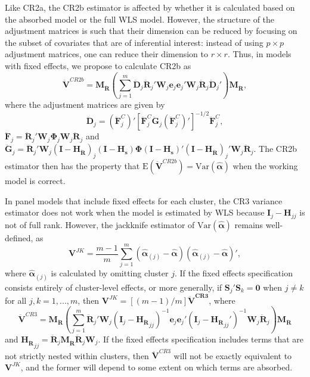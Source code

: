 \documentclass[12pt]{article}\usepackage[]{graphicx}\usepackage[]{color}
\newcommand{\E}{\text{E}}
\newcommand{\Var}{\text{Var}}
\newcommand{\bm}{\mathbf}
\newcommand{\bs}{\boldsymbol}
\begin{document}
Like CR2a, the CR2b estimator is affected by whether it is calculated based on the absorbed model or the full WLS model. However, the structure of the adjustment matrices is such that their dimension can be reduced by focusing on the subset of covariates that are of inferential interest: instead of using $p \times p$ adjustment matrices, one can reduce their dimension to $r \times r$. Thus, in models with fixed effects, we propose to calculate CR2b as 
\begin{equation}
\label{eq:V_CR2b_FE}
\bm{\ddot{V}}^{CR2b} = \bm{M_{\ddot{R}}} \left(\sum_{j=1}^m \bm{\ddot{D}}_j \bm{\ddot{R}}_j' \bm{W}_j \bm{e}_j \bm{e}_j' \bm{W}_j \bm{\ddot{R}}_j \bm{\ddot{D}}_j'\right) \bm{M_{\ddot{R}}},
\end{equation}
where the adjustment matrices are given by 
\begin{equation}
\bm{\ddot{D}}_j = \left(\bm{\ddot{F}}_j^C\right)'\left[\bm{\ddot{F}}_j^C \bm{\ddot{G}}_j \left(\bm{\ddot{F}}_j^C\right)'\right]^{-1/2}\bm{\ddot{F}}_j^C,
\end{equation}
$\bm{\ddot{F}}_j = \bm{\ddot{R}}_j' \bm{W}_j \bs\Phi_j \bm{W}_j \bm{\ddot{R}}_j$ and $\bm{\ddot{G}}_j = \bm{\ddot{R}}_j' \bm{W}_j \left(\bm{I} - \bm{H_{\ddot{R}}}\right)_j  \left(\bm{I} - \bm{H_s}\right) \bs\Phi \left(\bm{I} - \bm{H_s}\right)' \left(\bm{I} - \bm{H_{\ddot{R}}}\right)_j' \bm{W}_j \bm{\ddot{R}}_j$. The CR2b estimator then has the property that $\E\left(\bm{\ddot{V}}^{CR2b}\right) = \Var\left(\bs{\hat\alpha}\right)$ when the working model is correct.

In panel models that include fixed effects for each cluster, the CR3 variance estimator does not work when the model is estimated by WLS because $\bm{I}_j - \bm{H}_{jj}$ is not of full rank. 
However, the jackknife estimator of $\Var\left(\bs{\hat\alpha}\right)$ remains well-defined, as 
\begin{equation}
\bm{V}^{JK} = \frac{m - 1}{m} \sum_{j=1}^m \left(\bs{\hat\alpha}_{(j)} - \bs{\hat\alpha}\right) \left(\bs{\hat\alpha}_{(j)} - \bs{\hat\alpha}\right)',
\end{equation}
where $\bs{\hat\alpha}_{(j)}$ is calculated by omitting cluster $j$. 
If the fixed effects specification consists entirely of cluster-level effects, or more generally, if $\bm{S}_j'\bm{S}_k = \bm{0}$ when $j \neq k$ for all $j,k=1,...,m$, then $\bm{V}^{JK} = [(m - 1) / m] \bm{\ddot{V}^{CR3}}$, where 
\begin{equation}
\label{eq:V_CR3_FE}
\bm{\ddot{V}}^{CR3} = \bm{M_{\ddot{R}}} \left(\sum_{j=1}^m \bm{\ddot{R}}_j' \bm{W}_j \left(\bm{I}_j - \bm{H_{\ddot{R}}}_{jj}\right)^{-1}\bm{e}_j \bm{e}_j' \left(\bm{I}_j - \bm{H_{\ddot{R}}}_{jj}'\right)^{-1}\bm{W}_j \bm{\ddot{R}}_j\right) \bm{M_{\ddot{R}}}
\end{equation}
and $\bm{H_{\ddot{R}}}_{jj} = \bm{\ddot{R}}_j \bm{M_{\ddot{R}}} \bm{\ddot{R}}_j\bm{W}_j$. 
If the fixed effects specification includes terms that are not strictly nested within clusters, then $\bm{\ddot{V}}^{CR3}$ will not be exactly equivalent to $\bm{V}^{JK}$, and the former will depend to some extent on which terms are absorbed.
\end{document}
